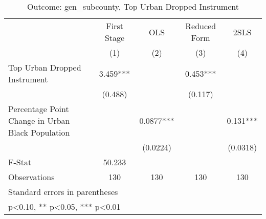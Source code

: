\begin{table}[htbp]\centering
\def\sym#1{\ifmmode^{#1}\else\(^{#1}\)\fi}
\caption{Outcome: gen\_subcounty, Top Urban Dropped Instrument}
\begin{tabular}{l*{4}{c}}
\toprule
                    & First Stage   &         OLS   &Reduced Form   &        2SLS   \\
                    &\multicolumn{1}{c}{(1)}   &\multicolumn{1}{c}{(2)}   &\multicolumn{1}{c}{(3)}   &\multicolumn{1}{c}{(4)}   \\
\midrule
Top Urban Dropped Instrument&       3.459***&               &       0.453***&               \\
                    &     (0.488)   &               &     (0.117)   &               \\
\addlinespace
Percentage Point Change in Urban Black Population&               &      0.0877***&               &       0.131***\\
                    &               &    (0.0224)   &               &    (0.0318)   \\
\midrule
F-Stat              &      50.233   &               &               &               \\
Observations        &         130   &         130   &         130   &         130   \\
\bottomrule
\multicolumn{5}{l}{\footnotesize Standard errors in parentheses}\\
\multicolumn{5}{l}{\footnotesize * p<0.10, ** p<0.05, *** p<0.01}\\
\end{tabular}
\end{table}
